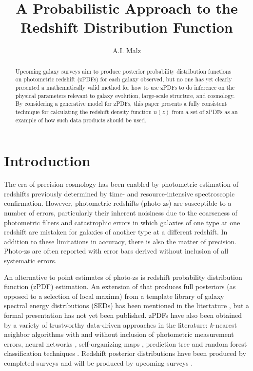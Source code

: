 \documentclass[preprint]{aastex}
\begin{document}
\title{A Probabilistic Approach to the Redshift Distribution Function}

\author{A.I. Malz}

\begin{abstract}
Upcoming galaxy surveys aim to produce posterior probability distribution functions on photometric redshift (zPDFs) for each galaxy observed, but no one has yet clearly presented a mathematically valid method for how to use zPDFs to do inference on the physical parameters relevant to galaxy evolution, large-scale structure, and cosmology.  By considering a generative model for zPDFs, this paper presents a fully consistent technique for calculating the redshift density function $n(z)$ from a set of zPDFs as an example of how such data products should be used.  
\end{abstract}


\section{Introduction}

The era of precision cosmology has been enabled by photometric estimation of redshifts previously determined by time- and resource-intensive spectroscopic confirmation.  However, photometric redshifts (photo-zs) are susceptible to a number of errors, particularly their inherent noisiness due to the coarseness of photometric filters and catastrophic errors in which galaxies of one type at one redshift are mistaken for galaxies of another type at a different redshift.  In addition to these limitations in accuracy, there is also the matter of precision.  Photo-zs are often reported with error bars derived without inclusion of all systematic errors.

An alternative to point estimates of photo-zs is redshift probability distribution function (zPDF) estimation.  An extension of \citet{ben00} that produces full posteriors (as opposed to a selection of local maxima) from a template library of galaxy spectral energy distributions (SEDs) has been mentioned in the litertature \citep{lop14}, but a formal presentation has not yet been published.  zPDFs have also been obtained by a variety of trustworthy data-driven approaches in the literature: $k$-nearest neighbor algorithms with \citep{bal08} and without \citep{she11} inclusion of photometric measurement errors, neural networks \citep{bon13}, self-organizing maps \citep{car14}, prediction tree and random forest classification techniques \citep{car13}.  Redshift posterior distributions have been produced by completed surveys \citep{she11} and will be produced by upcoming surveys \citep{abe09}.
\end{document}
